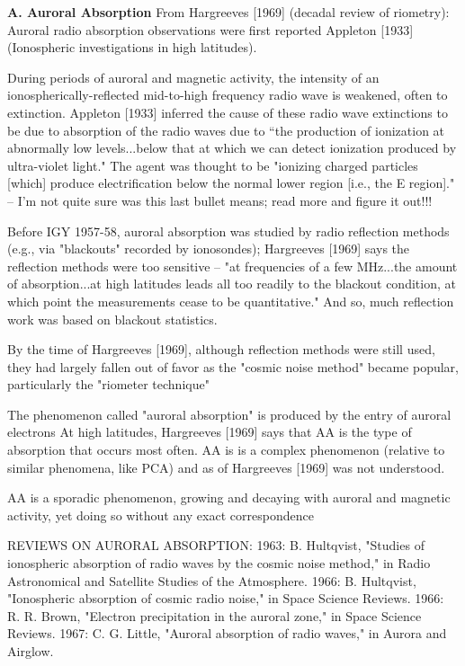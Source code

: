   \textbf{A. Auroral Absorption}
     From Hargreeves [1969] (decadal review of riometry):
     Auroral radio absorption observations were first reported Appleton 
     [1933] (Ionospheric investigations in high latitudes). 

     During periods of auroral and magnetic activity, the intensity of an
     ionospherically-reflected mid-to-high frequency radio wave is weakened,
     often to extinction.  Appleton [1933] inferred the cause of these radio
     wave extinctions to be due to absorption of the radio waves due to
     ``the production of ionization at abnormally low levels...below
     that at which we can detect ionization produced by ultra-violet
     light." The agent was thought to be "ionizing charged particles
     [which] produce electrification below the normal lower region
     [i.e., the E region]." 
     -- I'm not quite sure was this last bullet means; read more and figure 
     it out!!!

     Before IGY 1957-58, auroral absorption was studied by
     radio reflection methods (e.g., via "blackouts" recorded by ionosondes);
     Hargreeves [1969] says the reflection methods were too sensitive 
     -- "at frequencies of a
     few MHz...the amount of absorption...at high latitudes leads all too
     readily to the blackout condition, at which point the measurements cease
     to be quantitative." And so, much reflection work was based on blackout
     statistics.

     By the time of Hargreeves [1969], although reflection methods were still
     used, they had largely
     fallen out of favor as the "cosmic noise method" became popular,
     particularly the "riometer technique"


     The phenomenon called "auroral absorption" 
     is produced by the entry of auroral electrons 
     At high latitudes, Hargreeves [1969] says that AA is the type of
     absorption that occurs most often. AA is is a complex phenomenon
     (relative to similar phenomena, like PCA) and as of Hargreeves
     [1969] was not understood.

     AA is a sporadic phenomenon, growing and decaying with auroral and
     magnetic activity, yet doing so without any exact correspondence

     REVIEWS ON AURORAL ABSORPTION:
     1963: B. Hultqvist, "Studies of ionospheric absorption of radio waves by the
     cosmic noise method," in Radio Astronomical and Satellite Studies of the
     Atmosphere.
     1966: B. Hultqvist, "Ionospheric absorption of cosmic radio noise," in
     Space Science Reviews.
     1966: R. R. Brown, "Electron precipitation in the auroral zone," in
     Space Science Reviews.
     1967: C. G. Little, "Auroral absorption of radio waves," in Aurora and
     Airglow.


